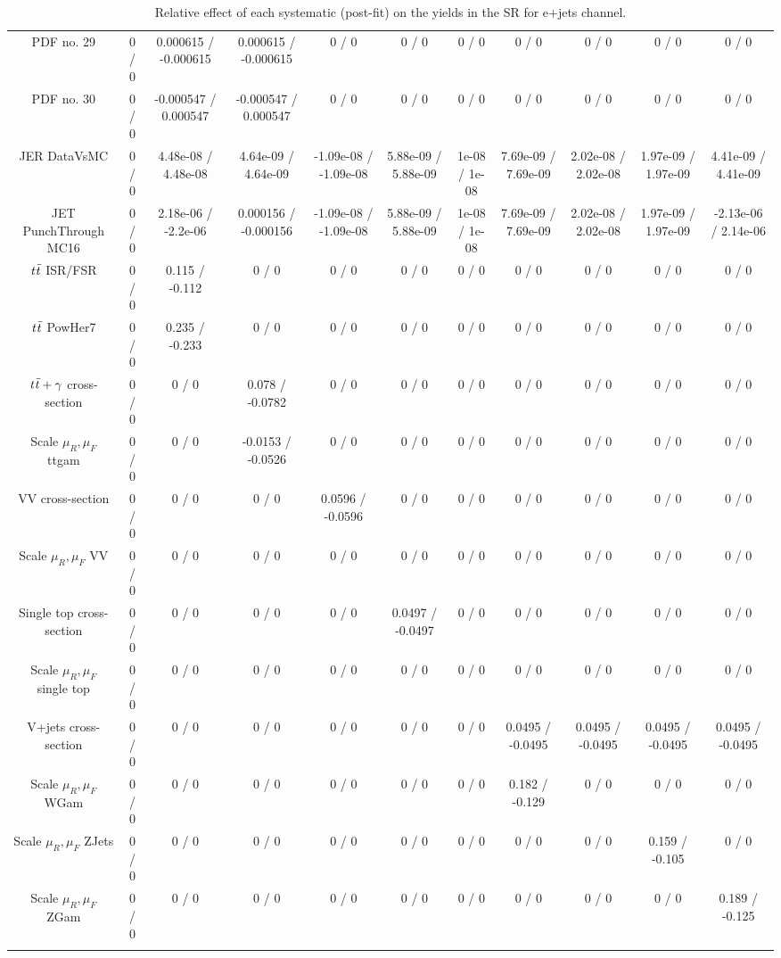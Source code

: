 {\begin{landscape}
\begin{longtable}{@{\extracolsep{\fill}}| *{11}{c|}}
  PDF no. 29 & 0 / 0 & 0.000615 / -0.000615 & 0.000615 / -0.000615 & 0 / 0 & 0 / 0 & 0 / 0 & 0 / 0 & 0 / 0 & 0 / 0 & 0 / 0 \\ 
  PDF no. 30 & 0 / 0 & -0.000547 / 0.000547 & -0.000547 / 0.000547 & 0 / 0 & 0 / 0 & 0 / 0 & 0 / 0 & 0 / 0 & 0 / 0 & 0 / 0 \\ 
  JER DataVsMC & 0 / 0 & 4.48e-08 / 4.48e-08 & 4.64e-09 / 4.64e-09 & -1.09e-08 / -1.09e-08 & 5.88e-09 / 5.88e-09 & 1e-08 / 1e-08 & 7.69e-09 / 7.69e-09 & 2.02e-08 / 2.02e-08 & 1.97e-09 / 1.97e-09 & 4.41e-09 / 4.41e-09 \\ 
  JET PunchThrough MC16 & 0 / 0 & 2.18e-06 / -2.2e-06 & 0.000156 / -0.000156 & -1.09e-08 / -1.09e-08 & 5.88e-09 / 5.88e-09 & 1e-08 / 1e-08 & 7.69e-09 / 7.69e-09 & 2.02e-08 / 2.02e-08 & 1.97e-09 / 1.97e-09 & -2.13e-06 / 2.14e-06 \\ 
$  \it{t\bar{t}}$ ISR/FSR & 0 / 0 & 0.115 / -0.112 & 0 / 0 & 0 / 0 & 0 / 0 & 0 / 0 & 0 / 0 & 0 / 0 & 0 / 0 & 0 / 0 \\ 
  $\it{t\bar{t}}$ PowHer7 & 0 / 0 & 0.235 / -0.233 & 0 / 0 & 0 / 0 & 0 / 0 & 0 / 0 & 0 / 0 & 0 / 0 & 0 / 0 & 0 / 0 \\ 
$  \it{t\bar{t}}+\gamma$ cross-section & 0 / 0 & 0 / 0 & 0.078 / -0.0782 & 0 / 0 & 0 / 0 & 0 / 0 & 0 / 0 & 0 / 0 & 0 / 0 & 0 / 0 \\ 
  Scale $\mu_{R},\mu_{F}$ ttgam & 0 / 0 & 0 / 0 & -0.0153 / -0.0526 & 0 / 0 & 0 / 0 & 0 / 0 & 0 / 0 & 0 / 0 & 0 / 0 & 0 / 0 \\ 
  VV cross-section & 0 / 0 & 0 / 0 & 0 / 0 & 0.0596 / -0.0596 & 0 / 0 & 0 / 0 & 0 / 0 & 0 / 0 & 0 / 0 & 0 / 0 \\ 
  Scale $\mu_{R},\mu_{F}$ VV & 0 / 0 & 0 / 0 & 0 / 0 & 0 / 0 & 0 / 0 & 0 / 0 & 0 / 0 & 0 / 0 & 0 / 0 & 0 / 0 \\ 
  Single top cross-section & 0 / 0 & 0 / 0 & 0 / 0 & 0 / 0 & 0.0497 / -0.0497 & 0 / 0 & 0 / 0 & 0 / 0 & 0 / 0 & 0 / 0 \\ 
  Scale $\mu_{R},\mu_{F}$ single top & 0 / 0 & 0 / 0 & 0 / 0 & 0 / 0 & 0 / 0 & 0 / 0 & 0 / 0 & 0 / 0 & 0 / 0 & 0 / 0 \\ 
  V+jets cross-section & 0 / 0 & 0 / 0 & 0 / 0 & 0 / 0 & 0 / 0 & 0 / 0 & 0.0495 / -0.0495 & 0.0495 / -0.0495 & 0.0495 / -0.0495 & 0.0495 / -0.0495 \\ 
  Scale $\mu_{R},\mu_{F}$ WGam & 0 / 0 & 0 / 0 & 0 / 0 & 0 / 0 & 0 / 0 & 0 / 0 & 0.182 / -0.129 & 0 / 0 & 0 / 0 & 0 / 0 \\ 
  Scale $\mu_{R},\mu_{F}$ ZJets & 0 / 0 & 0 / 0 & 0 / 0 & 0 / 0 & 0 / 0 & 0 / 0 & 0 / 0 & 0 / 0 & 0.159 / -0.105 & 0 / 0 \\ 
  Scale $\mu_{R},\mu_{F}$ ZGam & 0 / 0 & 0 / 0 & 0 / 0 & 0 / 0 & 0 / 0 & 0 / 0 & 0 / 0 & 0 / 0 & 0 / 0 & 0.189 / -0.125 \\ 
\hline 
\caption{Relative effect of each systematic (post-fit) on the yields in the SR for e+jets channel.} 
\label{tab:ejetsSyst}
\end{longtable}





\end{landscape}}
